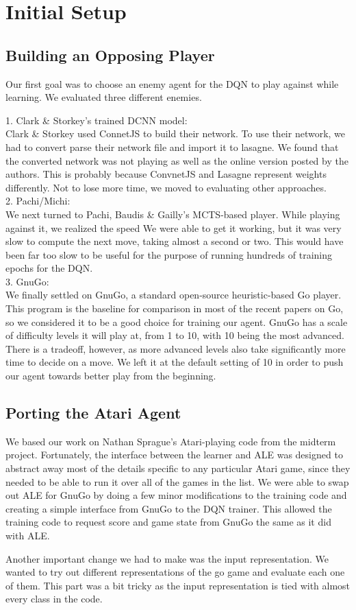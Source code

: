 \section{Initial Setup}

\subsection*{Building an Opposing Player}

Our first goal was to choose an enemy agent for the DQN to play against while learning. We evaluated three different enemies.

1. Clark \& Storkey's trained DCNN model: \\
Clark \& Storkey used ConnetJS to build their network. To use their network, we had to convert parse their network file and import it to lasagne. We found that the converted network was not playing as well as the online version posted by the authors. This is probably because ConvnetJS and Lasagne represent weights differently. Not to lose more time, we moved to evaluating other approaches.
\\

2. Pachi/Michi: \\
We next turned to Pachi, Baudis \& Gailly's MCTS-based player. While playing against it, we realized the speed  We were able to get it working, but it was very slow to compute the next move, taking almost a second or two. This would have been far too slow to be useful for the purpose of running hundreds of training epochs for the DQN.\\

3. GnuGo:\\
We finally settled on GnuGo, a standard open-source heuristic-based Go player. This program is the baseline for comparison in most of the recent papers on Go, so we considered it to be a good choice for training our agent. GnuGo has a scale of difficulty levels it will play at, from 1 to 10, with 10 being the most advanced. There is a tradeoff, however, as more advanced levels also take significantly more time to decide on a move. We left it at the default setting of 10 in order to push our agent towards better play from the beginning.

\subsection*{Porting the Atari Agent}

We based our work on Nathan Sprague's Atari-playing code from the midterm project. Fortunately, the interface between the learner and ALE was designed to abstract away most of the details specific to any particular Atari game, since they needed to be able to run it over all of the games in the list. We were able to swap out ALE for GnuGo by doing a few minor modifications to the training code and creating a simple interface from GnuGo to the DQN trainer. This allowed the training code to request score and game state from GnuGo the same as it did with ALE.

Another important change we had to make was the input representation. We wanted to try out different representations of the go game and evaluate each one of them. This part was a bit tricky as the input representation is tied with almost every class in the code.